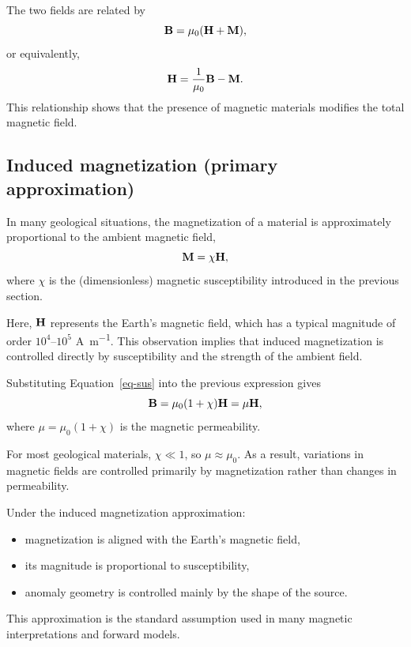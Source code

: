 The two fields are related by
\begin{equation}
    \vb{B} = \mu_0 (\vb{H} + \vb{M}),
\end{equation}
or equivalently,
\begin{equation}
    \vb{H} = \frac{1}{\mu_0}\vb{B} - \vb{M}.
\end{equation}
This relationship shows that the presence of magnetic materials modifies the total magnetic field.

\subsection{Induced magnetization (primary approximation)}

In many geological situations, the magnetization of a material is approximately proportional to the ambient magnetic field,
\begin{equation}
    \vb{M} = \chi \vb{H},
    \label{eq-sus}
\end{equation}
where $\chi$ is the (dimensionless) magnetic susceptibility introduced in the previous section.

Here, $\vb{H}$ represents the Earth's magnetic field, which has a typical magnitude of order $10^4$--$10^5$ \si{A.m^{-1}}. This observation implies that induced magnetization is controlled directly by susceptibility and the strength of the ambient field.

Substituting Equation~\ref{eq-sus} into the previous expression gives
\begin{equation}
    \vb{B} = \mu_0 (1+\chi)\vb{H} = \mu \vb{H},
\end{equation}
where $\mu = \mu_0 (1+\chi)$ is the magnetic permeability.

For most geological materials, $\chi \ll 1$, so $\mu \approx \mu_0$. As a result, variations in magnetic fields are controlled primarily by magnetization rather than changes in permeability.

Under the induced magnetization approximation:
\begin{itemize}
    \item magnetization is aligned with the Earth's magnetic field,
    \item its magnitude is proportional to susceptibility,
    \item anomaly geometry is controlled mainly by the shape of the source.
\end{itemize}
This approximation is the standard assumption used in many magnetic interpretations and forward models.

